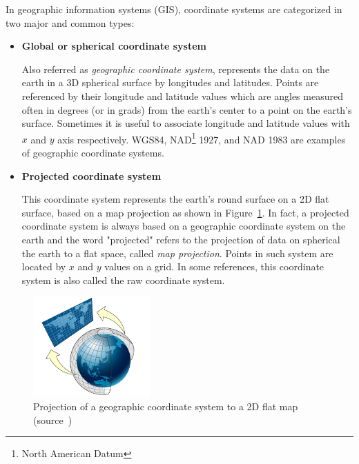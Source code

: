 \documentclass[a4paper,12pt]{article}
\begin{document}
  
In geographic information systems (GIS), coordinate systems are categorized in two major and common types:
\begin{itemize}
\item \textbf{Global or spherical coordinate system} 

Also referred as \textit{geographic coordinate system}, represents the data on the earth in a 3D spherical surface by longitudes and latitudes. Points are referenced by their longitude and latitude values which are angles measured often in degrees (or in grads) from the earth's center to a point on the earth's surface. Sometimes it is useful to associate longitude and latitude values with $x$ and $y$ axis respectively. WGS84, NAD\footnote{North American Datum} 1927, and NAD 1983 are examples of geographic coordinate systems. 

\item \textbf{Projected coordinate system} 

This coordinate system represents the earth's round surface on a 2D flat surface, based on a map projection as shown in Figure~\ref{figproject}. In fact, a projected coordinate system is always based on a geographic coordinate system on the earth and the word "projected" refers to the projection of data on spherical the earth to a flat space, called \textit{map projection}. Points in such system are located by $x$ and $y$ values on a grid. 
In some references, this coordinate system is also called the raw coordinate system.
\end{itemize}

\begin{figure}
\centering
\includegraphics[width=0.4\textwidth]{sphere_to_cylinder}
\caption{Projection of a geographic coordinate system to a 2D flat map (source~\cite{projected})}
\label{figproject}
\end{figure}
\end{document}
